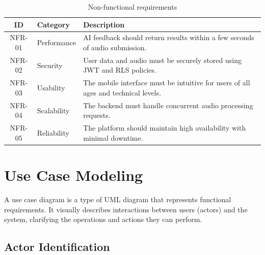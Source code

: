 \begin{table}[H]
  \centering
  \caption{Non-functional requirements}
  \label{tab:cs_nonfunc_req}
  \renewcommand{\arraystretch}{1.3}
  \begin{tabular}{clp{8cm}}
    \toprule
    \textbf{ID} & \textbf{Category} & \textbf{Description} \\
    \midrule
    NFR-01 & Performance & AI feedback should return results within a few seconds of audio submission. \\
    NFR-02 & Security & User data and audio must be securely stored using JWT and RLS policies. \\
    NFR-03 & Usability & The mobile interface must be intuitive for users of all ages and technical levels. \\
    NFR-04 & Scalability & The backend must handle concurrent audio processing requests. \\
    NFR-05 & Reliability & The platform should maintain high availability with minimal downtime. \\
    \bottomrule
  \end{tabular}
\end{table}

\section{Use Case Modeling}
\label{sec:cs_usecases}

\begin{emeraldbox}[title=Use Case Diagram (UCD)]
A use case diagram is a type of UML diagram that represents functional requirements. It visually describes interactions between users (actors) and the system, clarifying the operations and actions they can perform.
\end{emeraldbox}

\subsection{Actor Identification}

